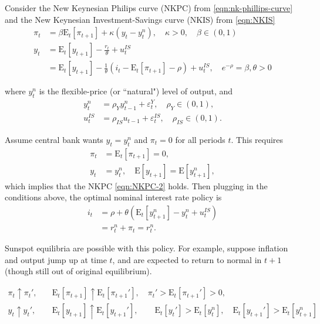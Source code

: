 \documentclass{article}
\newcommand{\E}[1]{\mathrm{E}\left[#1\right]}
\newcommand{\Et}[1]{\mathrm{E}_t\left[#1\right]}
\newcommand{\?}{\textcolor{red}{(?)}} %
\begin{document}
        
        Consider the New Keynesian Philips curve (NKPC) from  \eqref{eqn:nk-phillips-curve} and the New Keynesian Investment-Savings curve (NKIS) from \eqref{eqn:NKIS}
        \begin{align}
            \pi_t
            &= \beta \Et{\pi_{t+1}} + \kappa (y_t - y^n_t),
            \quad
            \kappa  > 0, \quad \beta \in (0, 1)
            \label{eqn:NKPC-2}
            \\
            y_t
            &= \Et{y_{t+1}} - \frac{r_t}{\theta}
            + u_t^{IS}
            \\
            &= \Et{y_{t+1}} - \frac{1}{\theta}(i_t - \Et{\pi_{t+1}} -\rho) + u_t^{IS},
            \quad e^{-\rho} = \beta, \theta > 0
            \label{eqn:NKIS-2}
        \end{align}
        
        where $y^n_t$ is the flexible-price (or ``natural") level of output, and
        \begin{align}
            y^n_t &= \rho_Y y^n_{t-1} + \varepsilon^Y_t,
            \quad \rho_Y \in (0, 1),
            \\
            u_t^{IS} &= \rho_{IS} u_{t-1} + \varepsilon^{IS}_t,
            \quad \rho_{IS} \in (0, 1).
        \end{align}
        
        Assume central bank wants $y_t = y^n_t$ and $\pi_t = 0$ for all periods $t$. This requires
        \begin{align}
            \pi_t
            &= \Et{\pi_{t+1}} = 0,
            \\
            y_t
            &= y_t^n, \quad \E{y_{t+1}} = \E{y_{t+1}^n},
        \end{align}
        which implies that the NKPC \eqref{eqn:NKPC-2} holds. Then plugging in the conditions above, the optimal  nominal interest rate policy is
        \begin{align}
            i_t
            &= \rho + \theta\left(\Et{y_{t+1}^n} - y_t^n + u_t^{IS}\right)
            \\
            &= r_t^n + \pi_t = r_t^n.
        \end{align}
        
        Sunspot equilibria are possible with this policy. For example, suppose inflation and output jump up at time $t$, and are expected to return to normal in $t+1$ (though still out of original equilibrium).
        
        \begin{align}
            \pi_t
            \uparrow
            \pi_t',
            &\quad
            \Et{\pi_{t+1}} \uparrow
            \Et{\pi_{t+1}'},
            \quad
            \pi_t' > \Et{\pi_{t+1}'} > 0,
            \\
            y_t \uparrow y_t',
            &\quad
            \Et{y_{t+1}} \uparrow \Et{y_{t+1}'},
            \qquad
            \Et{y_t'} > \Et{y_t^n}, \quad
            \Et{y_{t+1}'} > \Et{y_{t+1}^n}
        \end{align}
        
\end{document}
